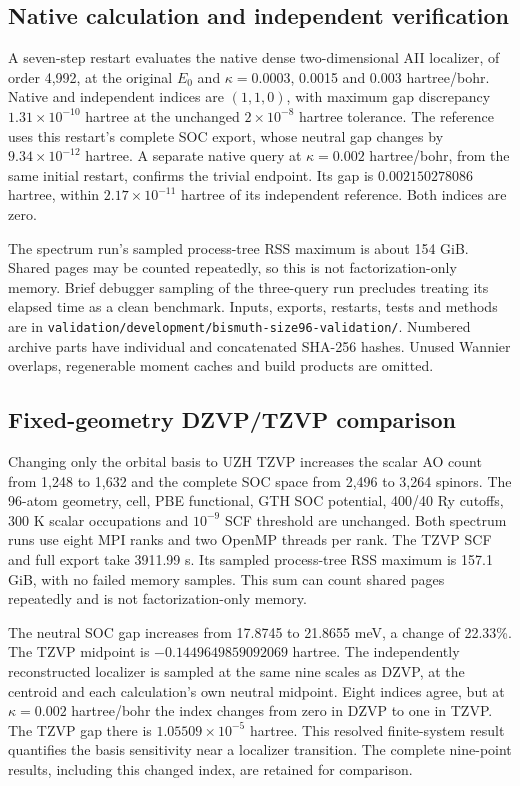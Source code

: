 \documentclass[11pt]{article}
\begin{document}
\subsection{Native calculation and independent verification}
A seven-step restart evaluates the native dense two-dimensional
AII localizer, of order 4,992, at the original $E_0$ and
$\kappa=0.0003$, 0.0015 and 0.003 hartree/bohr.
Native and independent indices are $(1,1,0)$, with maximum
gap discrepancy $1.31\times10^{-10}$ hartree at the unchanged
$2\times10^{-8}$ hartree tolerance. The reference uses this
restart's complete SOC export, whose neutral gap changes by
$9.34\times10^{-12}$ hartree. A separate native query at
$\kappa=0.002$ hartree/bohr, from the same initial restart,
confirms the trivial endpoint. Its gap is $0.002150278086$
hartree, within $2.17\times10^{-11}$ hartree of its independent
reference. Both indices are zero.

The spectrum run's sampled process-tree RSS maximum is about
154 GiB. Shared pages may be counted repeatedly, so this is
not factorization-only memory. Brief debugger sampling of the
three-query run precludes treating its elapsed time as a clean
benchmark. Inputs, exports, restarts, tests and methods are in
\nolinkurl{validation/development/bismuth-size96-validation/}.
Numbered archive parts have individual and concatenated SHA-256
hashes. Unused Wannier overlaps, regenerable moment caches and
build products are omitted.

\subsection{Fixed-geometry DZVP/TZVP comparison}
\label{sec:si-bismuth96-basis}
Changing only the orbital basis to UZH TZVP increases the scalar
AO count from 1,248 to 1,632 and the complete SOC space from
2,496 to 3,264 spinors. The 96-atom geometry, cell, PBE functional,
GTH SOC potential, 400/40 Ry cutoffs, 300 K scalar occupations
and $10^{-9}$ SCF threshold are unchanged. Both spectrum runs
use eight MPI ranks and two OpenMP threads per rank.
The TZVP SCF and full export take 3911.99 s. Its sampled
process-tree RSS maximum is 157.1 GiB, with no failed memory
samples. This sum can count shared pages repeatedly and is not
factorization-only memory.

The neutral SOC gap increases from 17.8745 to 21.8655 meV,
a change of 22.33\%. The TZVP midpoint is
$-0.1449649859092069$ hartree. The independently reconstructed
localizer is sampled at the same nine scales as DZVP, at the
centroid and each calculation's own neutral midpoint. Eight
indices agree, but at $\kappa=0.002$ hartree/bohr the index
changes from zero in DZVP to one in TZVP. The TZVP gap there
is $1.05509\times10^{-5}$ hartree. This resolved finite-system
result quantifies the basis sensitivity near a localizer transition.
The complete nine-point results, including this changed index,
are retained for comparison.
\end{document}

